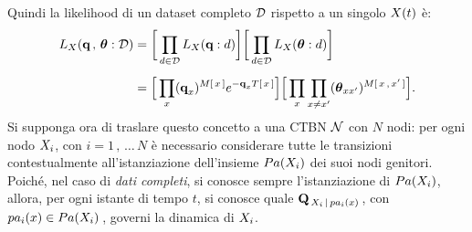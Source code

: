 Quindi la likelihood di un dataset completo $\mathcal{D}$ rispetto a un singolo \mprocess*{} \omog*{} $\mathnormal{X}(t)$ è:
\begin{equation}
\label{eq:ctbn-data-hmp-likelihood}
\begin{split}
L_{\setel{X}}(\param{q}\,,\,\param{$\theta$}:\conceptsym{D})&=\bigg[\prod_{d\in\conceptsym{D}}L_{\setel{X}}(\param{q}:d)\bigg]\bigg[\prod_{d\in\conceptsym{D}}L_{\setel{X}}(\param{$\theta$}:d)\bigg]\\[5pt]
&=\Big[\prod_{\setel{x}}(\param{q}_{\setel{x}})^{\mstat{x}}e^{-\param{q}_{\setel{x}}\tstat{x}}\Big]\Big[\prod_{x}\prod_{x\neq x^{\prime}}(\param{$\theta$}_{\setel{x}\setel{x}^{\prime}})^{\mstat[x]{\setel{x}^\prime}}\Big]\text{.}
\end{split}
\end{equation}
Si supponga ora di traslare questo concetto a una \acl{CTBN} $\mathcal{N}$ con $N$ nodi: per ogni nodo $\mathnormal{X_i}$, con $i=1\,,\,\dotsc\,N$ è necessario considerare tutte le transizioni contestualmente all'istanziazione dell'insieme $Pa(\mathnormal{X_i})$ dei suoi nodi genitori. Poiché, nel caso di \emph{dati completi}, si conosce sempre l'istanziazione di $Pa(\mathnormal{X_i})$, allora, per ogni istante di tempo $t$, si conosce quale \im*{} $\mathbf{Q}_{\,\mathnormal{X_i}\,\arrowvert\,pa_i(\mathnormal{x})}\,$, con $pa_i(\mathnormal{x})\in Pa(\mathnormal{X_i})\,$, governi la dinamica di $\mathnormal{X_i}$.


